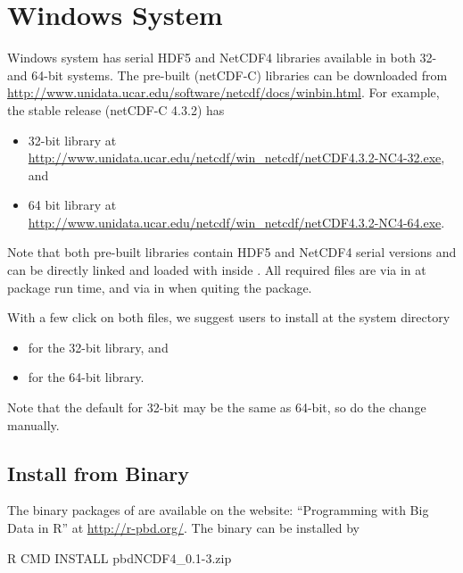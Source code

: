 
\section[Windows System]{Windows System}
\label{sec:windows_system}

Windows system has serial HDF5 and NetCDF4 libraries available in
both 32- and 64-bit systems. The pre-built (netCDF-C) libraries can be
downloaded from
\url{http://www.unidata.ucar.edu/software/netcdf/docs/winbin.html}.
For example, the stable release (netCDF-C 4.3.2) has
\begin{itemize}
\item 32-bit library at \\
\url{http://www.unidata.ucar.edu/netcdf/win_netcdf/netCDF4.3.2-NC4-32.exe}, and
\item 64 bit library at \\
\url{http://www.unidata.ucar.edu/netcdf/win_netcdf/netCDF4.3.2-NC4-64.exe}.
\end{itemize}
Note that both pre-built libraries contain HDF5 and NetCDF4 serial versions
and can be directly linked and loaded with  inside .
All required  files are via  in
 at package run time, and via  in
 when quiting the package.

With a few click on both  files,
we suggest users to install at the system directory
\begin{itemize}
\item
{} for the 32-bit library, and
\item
{} for the 64-bit library.
\end{itemize}
Note that the default for 32-bit may be the same as 64-bit, so do the change
manually.


\subsection[Install from Binary]{Install from Binary}
\label{sec:install_from_binary}

The binary packages of  are available on the website:
``Programming with Big Data in R'' at
\url{http://r-pbd.org/}.%
The binary can be installed by
\begin{Command}
R CMD INSTALL pbdNCDF4_0.1-3.zip
\end{Command}

